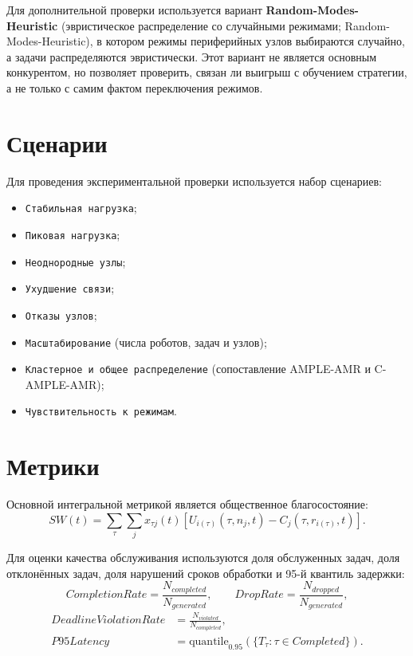 Для дополнительной проверки используется вариант \textbf{Random-Modes-Heuristic} (эвристическое распределение со случайными режимами; Random-Modes-Heuristic), в котором режимы периферийных узлов выбираются случайно, а задачи распределяются эвристически. Этот вариант не является основным конкурентом, но позволяет проверить, связан ли выигрыш с обучением стратегии, а не только с самим фактом переключения режимов.

\section{Сценарии}

Для проведения экспериментальной проверки используется набор сценариев:
\begin{itemize}
    \item \texttt{Стабильная нагрузка};
    \item \texttt{Пиковая нагрузка};
    \item \texttt{Неоднородные узлы};
    \item \texttt{Ухудшение связи};
    \item \texttt{Отказы узлов};
    \item \texttt{Масштабирование} (числа роботов, задач и узлов);
    \item \texttt{Кластерное и общее распределение} (сопоставление AMPLE-AMR и C-AMPLE-AMR);
    \item \texttt{Чувствительность к режимам}.
\end{itemize}

\section{Метрики}

Основной интегральной метрикой является общественное благосостояние:
\[
SW(t)=
\sum_{\tau}
\sum_j
x_{\tau j}(t)
\left[
U_{i(\tau)}(\tau,n_j,t)-C_j(\tau,r_{i(\tau)},t)
\right].
\]

Для оценки качества обслуживания используются доля обслуженных задач, доля отклонённых задач, доля нарушений сроков обработки и 95-й квантиль задержки:
\[
CompletionRate = \frac{N_{completed}}{N_{generated}},
\qquad
DropRate = \frac{N_{dropped}}{N_{generated}},
\]
\[
\begin{aligned}
DeadlineViolationRate &= \frac{N_{violated}}{N_{completed}}, \\
P95Latency &= \mathrm{quantile}_{0.95}\left(\{T_{\tau}:\tau\in Completed\}\right).
\end{aligned}
\]

